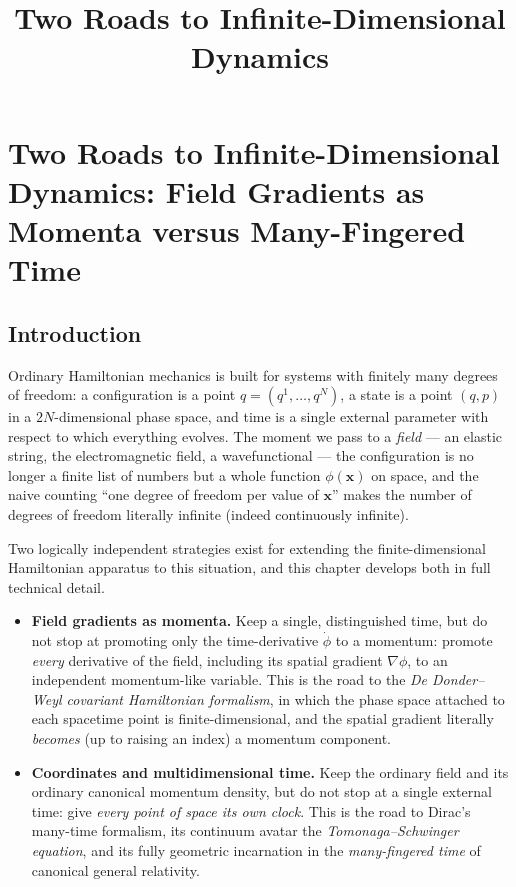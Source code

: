 \documentclass[11pt]{book}
\title{Two Roads to Infinite-Dimensional Dynamics}
\author{}
\date{}
\theoremstyle{definition}
\theoremstyle{remark}
\begin{document}
\chapter{Two Roads to Infinite-Dimensional Dynamics: Field Gradients as Momenta versus Many-Fingered Time}
\label{ch:infinite-dof}

\section{Introduction}

Ordinary Hamiltonian mechanics is built for systems with finitely many degrees of freedom: a configuration is a point $q=(q^1,\dots,q^N)$, a state is a point $(q,p)$ in a $2N$-dimensional phase space, and time is a single external parameter with respect to which everything evolves. The moment we pass to a \emph{field} --- an elastic string, the electromagnetic field, a wavefunctional --- the configuration is no longer a finite list of numbers but a whole function $\phi(\mathbf{x})$ on space, and the naive counting ``one degree of freedom per value of $\mathbf{x}$'' makes the number of degrees of freedom literally infinite (indeed continuously infinite).

Two logically independent strategies exist for extending the finite-dimensional Hamiltonian apparatus to this situation, and this chapter develops both in full technical detail.

\begin{itemize}
\item[(I)] \textbf{Field gradients as momenta.} Keep a single, distinguished time, but do not stop at promoting only the time-derivative $\dot\phi$ to a momentum: promote \emph{every} derivative of the field, including its spatial gradient $\nabla\phi$, to an independent momentum-like variable. This is the road to the \emph{De Donder--Weyl covariant Hamiltonian formalism}, in which the phase space attached to each spacetime point is finite-dimensional, and the spatial gradient literally \emph{becomes} (up to raising an index) a momentum component.

\item[(II)] \textbf{Coordinates and multidimensional time.} Keep the ordinary field and its ordinary canonical momentum density, but do not stop at a single external time: give \emph{every point of space its own clock}. This is the road to Dirac's many-time formalism, its continuum avatar the \emph{Tomonaga--Schwinger equation}, and its fully geometric incarnation in the \emph{many-fingered time} of canonical general relativity.
\end{itemize}
\end{document}
